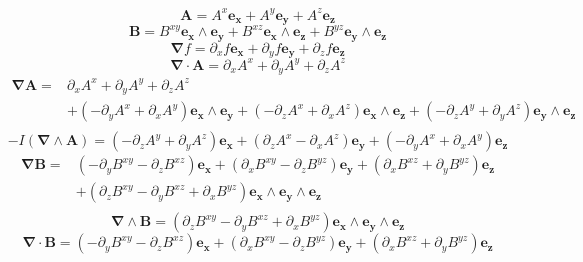 \documentclass[12pt]{report}
\newcommand{\bm}[1]{\boldsymbol{#1}}
\newcommand{\W}{\wedge}
\begin{document}
\begin{equation*} \bm{A} = A^{x}\bm{e_{x}}+A^{y}\bm{e_{y}}+A^{z}\bm{e_{z}} \end{equation*}
\begin{equation*} \bm{B} = B^{xy}\bm{e_{x}\W e_{y}}+B^{xz}\bm{e_{x}\W e_{z}}+B^{yz}\bm{e_{y}\W e_{z}} \end{equation*}
\begin{equation*} \bm{\nabla}  f = \partial_{x} f\bm{e_{x}}+\partial_{y} f\bm{e_{y}}+\partial_{z} f\bm{e_{z}} \end{equation*}
\begin{equation*} \bm{\nabla} \cdot \bm{A} = \partial_{x} A^{x} + \partial_{y} A^{y} + \partial_{z} A^{z} \end{equation*}
 \begin{align*} \bm{\nabla}  \bm{A} =  & \partial_{x} A^{x} + \partial_{y} A^{y} + \partial_{z} A^{z} \\  & +\left ( - \partial_{y} A^{x} + \partial_{x} A^{y}\right ) \bm{e_{x}\W e_{y}}+\left ( - \partial_{z} A^{x} + \partial_{x} A^{z}\right ) \bm{e_{x}\W e_{z}}+\left ( - \partial_{z} A^{y} + \partial_{y} A^{z}\right ) \bm{e_{y}\W e_{z}} \\ \end{align*}
\begin{equation*} -I (\bm{\nabla} \W \bm{A}) = \left ( - \partial_{z} A^{y} + \partial_{y} A^{z}\right ) \bm{e_{x}}+\left ( \partial_{z} A^{x} - \partial_{x} A^{z}\right ) \bm{e_{y}}+\left ( - \partial_{y} A^{x} + \partial_{x} A^{y}\right ) \bm{e_{z}} \end{equation*}
 \begin{align*} \bm{\nabla}  \bm{B} =  & \left ( - \partial_{y} B^{xy} - \partial_{z} B^{xz}\right ) \bm{e_{x}}+\left ( \partial_{x} B^{xy} - \partial_{z} B^{yz}\right ) \bm{e_{y}}+\left ( \partial_{x} B^{xz} + \partial_{y} B^{yz}\right ) \bm{e_{z}} \\  & +\left ( \partial_{z} B^{xy} - \partial_{y} B^{xz} + \partial_{x} B^{yz}\right ) \bm{e_{x}\W e_{y}\W e_{z}} \\ \end{align*}
\begin{equation*} \bm{\nabla} \W \bm{B} = \left ( \partial_{z} B^{xy} - \partial_{y} B^{xz} + \partial_{x} B^{yz}\right ) \bm{e_{x}\W e_{y}\W e_{z}} \end{equation*}
\begin{equation*} \bm{\nabla} \cdot \bm{B} = \left ( - \partial_{y} B^{xy} - \partial_{z} B^{xz}\right ) \bm{e_{x}}+\left ( \partial_{x} B^{xy} - \partial_{z} B^{yz}\right ) \bm{e_{y}}+\left ( \partial_{x} B^{xz} + \partial_{y} B^{yz}\right ) \bm{e_{z}} \end{equation*}
\end{document}

